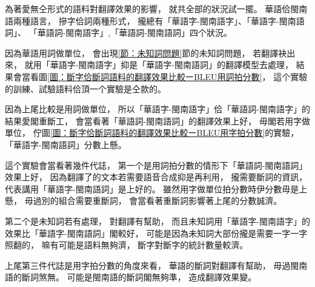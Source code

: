 為著愛無仝形式的語料對翻譯效果的影響，
就共全部的狀況試一擺。
華語佮閩南語兩種語言，
摻字佮詞兩種形式，
攏總有「華語字-閩南語字」、「華語字-閩南語詞」、
「華語詞-閩南語字」,「華語詞-閩南語詞」四个狀況。

因為華語用詞做單位，
會出現\ref{節：未知詞問題}節的未知詞問題，
若翻譯袂出來，
就用「華語字-閩南語字」抑是「華語字-閩南語詞」的翻譯模型去處理，
結果會當看圖\ref{圖：斷字佮斷詞語料的翻譯效果比較ーBLEU用詞拍分數}，
這个實驗的訓練、試驗語料佮頂一个實驗是仝款的。

因為上尾比較是用詞做單位，
所以「華語字-閩南語字」佮「華語詞-閩南語字」的結果愛閣重斷工，
會當看著「華語詞-閩南語詞」的翻譯效果上好，
毋閣若用字做單位，
佇圖\ref{圖：斷字佮斷詞語料的翻譯效果比較ーBLEU用字拍分數}的實驗，
「華語字-閩南語詞」分數上懸。

這个實驗會當看著幾件代誌，
第一个是用詞拍分數的情形下「華語詞-閩南語詞」效果上好，
因為翻譯了的文本若需要語音合成抑是再利用，
攏需要斷詞的資訊，
代表講用「華語字-閩南語詞」是上好的。
雖然用字做單位拍分數時伊分數毋是上懸，
毋過別的組合需要重斷詞，
會當看著重斷詞影響著上尾的分數誠濟。

第二个是未知詞若有處理，
對翻譯有幫助，
而且未知詞用「華語字-閩南語字」的效果比「華語字-閩南語詞」閣較好，
可能是因為未知詞大部份攏是需要一字一字照翻的，
嘛有可能是語料無夠濟，
斷字對斷字的統計數量較濟。

上尾第三件代誌是用字拍分數的角度來看，
華語的斷詞對翻譯有幫助，
毋過閩南語的斷詞煞無。
可能是閩南語的斷詞閣無夠準，
造成翻譯效果變。
